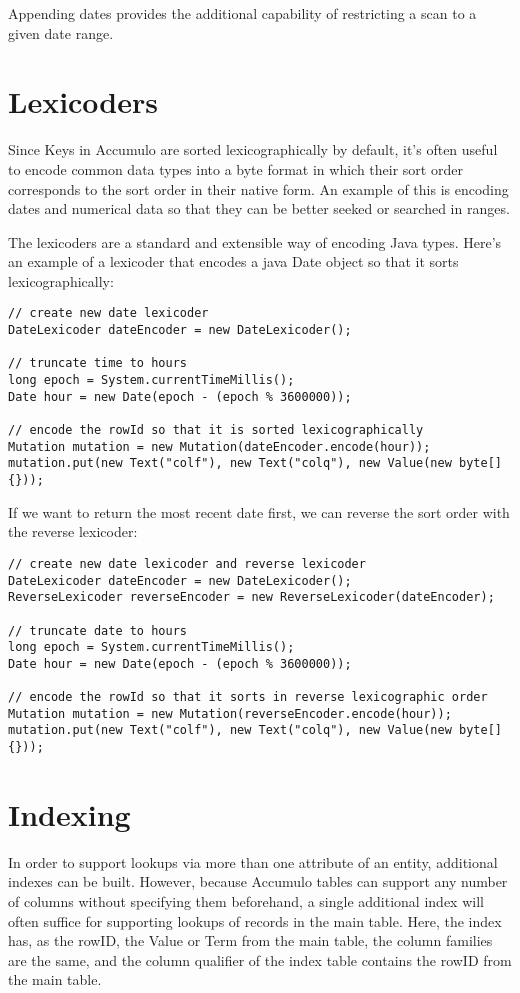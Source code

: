 Appending dates provides the additional capability of restricting a scan to a given
date range.

\section{Lexicoders}
Since Keys in Accumulo are sorted lexicographically by default, it's often useful to encode
common data types into a byte format in which their sort order corresponds to the sort order
in their native form. An example of this is encoding dates and numerical data so that they can
be better seeked or searched in ranges.

The lexicoders are a standard and extensible way of encoding Java types. Here's an example
of a lexicoder that encodes a java Date object so that it sorts lexicographically:

\begingroup\fontsize{8pt}{8pt}\selectfont\begin{verbatim}
// create new date lexicoder
DateLexicoder dateEncoder = new DateLexicoder();

// truncate time to hours
long epoch = System.currentTimeMillis();
Date hour = new Date(epoch - (epoch % 3600000));

// encode the rowId so that it is sorted lexicographically
Mutation mutation = new Mutation(dateEncoder.encode(hour));
mutation.put(new Text("colf"), new Text("colq"), new Value(new byte[]{}));
\end{verbatim}\endgroup

If we want to return the most recent date first, we can reverse the sort order
with the reverse lexicoder:

\begingroup\fontsize{8pt}{8pt}\selectfont\begin{verbatim}
// create new date lexicoder and reverse lexicoder
DateLexicoder dateEncoder = new DateLexicoder();
ReverseLexicoder reverseEncoder = new ReverseLexicoder(dateEncoder);

// truncate date to hours
long epoch = System.currentTimeMillis();
Date hour = new Date(epoch - (epoch % 3600000));

// encode the rowId so that it sorts in reverse lexicographic order
Mutation mutation = new Mutation(reverseEncoder.encode(hour));
mutation.put(new Text("colf"), new Text("colq"), new Value(new byte[]{}));
\end{verbatim}\endgroup


\section{Indexing}
In order to support lookups via more than one attribute of an entity, additional
indexes can be built. However, because Accumulo tables can support any number of
columns without specifying them beforehand, a single additional index will often
suffice for supporting lookups of records in the main table. Here, the index has, as
the rowID, the Value or Term from the main table, the column families are the same,
and the column qualifier of the index table contains the rowID from the main table.

